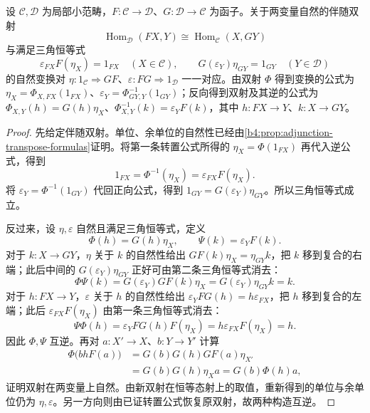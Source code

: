 \begin{theorem}[伴随的单位与余单位刻画]\label{b4:thm:adjunction-unit-counit}
	设 \(\mathcal C,\mathcal D\) 为局部小范畴，\(F:\mathcal C\rightarrow\mathcal D\)、\(G:\mathcal D\rightarrow\mathcal C\) 为函子。关于两变量自然的伴随双射
	\[
		\operatorname{Hom}_{\mathcal D}(FX,Y) \cong\operatorname{Hom}_{\mathcal C}(X,GY)
	\]
	与满足三角恒等式
	\[
		\varepsilon_{FX}F(\eta_X)=1_{FX}\quad(X\in\mathcal C),\qquad G(\varepsilon_Y)\eta_{GY}=1_{GY}\quad(Y\in\mathcal D)
	\]
	的自然变换对 \(\eta:1_{\mathcal C}\Rightarrow GF\)、\(\varepsilon:FG\Rightarrow1_{\mathcal D}\) 一一对应。由双射 \(\Phi\) 得到变换的公式为 \(\eta_X=\Phi_{X,FX}(1_{FX})\)、\(\varepsilon_Y=\Phi^{-1}_{GY,Y}(1_{GY})\)；反向得到双射及其逆的公式为 \(\Phi_{X,Y}(h)=G(h)\eta_X\)、\(\Phi^{-1}_{X,Y}(k)=\varepsilon_YF(k)\)，其中 \(h:FX\rightarrow Y\)、\(k:X\rightarrow GY\)。
\end{theorem}
\begin{proof}
	先给定伴随双射。单位、余单位的自然性已经由\cref{b4:prop:adjunction-transpose-formulas}证明。将第一条转置公式所得的 \(\eta_X=\Phi(1_{FX})\) 再代入逆公式，得到
	\[
		1_{FX}=\Phi^{-1}(\eta_X)=\varepsilon_{FX}F(\eta_X).
	\]
	将 \(\varepsilon_Y=\Phi^{-1}(1_{GY})\) 代回正向公式，得到 \(1_{GY}=G(\varepsilon_Y)\eta_{GY}\)。所以三角恒等式成立。

	反过来，设 \(\eta,\varepsilon\) 自然且满足三角恒等式，定义
	\[
		\Phi(h)=G(h)\eta_X,\qquad \Psi(k)=\varepsilon_YF(k).
	\]
	对于 \(k:X\rightarrow GY\)，\(\eta\) 关于 \(k\) 的自然性给出 \(GF(k)\eta_X=\eta_{GY}k\)，把 \(k\) 移到复合的右端；此后中间的 \(G(\varepsilon_Y)\eta_{GY}\) 正好可由第二条三角恒等式消去：
	\[
		\Phi\Psi(k) =G(\varepsilon_Y)GF(k)\eta_X =G(\varepsilon_Y)\eta_{GY}k=k.
	\]
	对于 \(h:FX\rightarrow Y\)，\(\varepsilon\) 关于 \(h\) 的自然性给出 \(\varepsilon_YFG(h)=h\varepsilon_{FX}\)，把 \(h\) 移到复合的左端；此后 \(\varepsilon_{FX}F(\eta_X)\) 由第一条三角恒等式消去：
	\[
		\Psi\Phi(h) =\varepsilon_YFG(h)F(\eta_X) =h\varepsilon_{FX}F(\eta_X)=h.
	\]
	因此 \(\Phi,\Psi\) 互逆。再对 \(a:X'\rightarrow X\)、\(b:Y\rightarrow Y'\) 计算
	\[
		\begin{aligned}
			\Phi\bigl(bhF(a)\bigr) &=G(b)G(h)GF(a)\eta_{X'}\\
			&=G(b)G(h)\eta_Xa =G(b)\Phi(h)a,
		\end{aligned}
	\]
	证明双射在两变量上自然。由新双射在恒等态射上的取值，重新得到的单位与余单位仍为 \(\eta,\varepsilon\)。另一方向则由已证转置公式恢复原双射，故两种构造互逆。
\end{proof}

